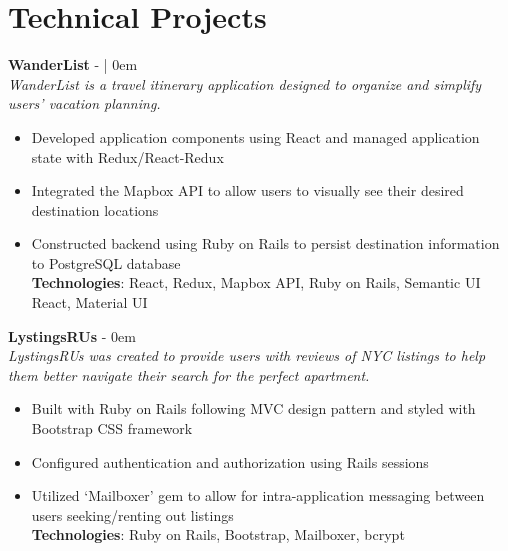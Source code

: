 \documentclass[letterpaper]{twentysecondcv} %
\begin{document}
 \makeprofile %
 

\section{Technical Projects}
\begin{flushleft}
\textbf{WanderList} - |{}
\openup 0em
\\
\textit {WanderList is a travel itinerary application designed to organize and simplify users’ vacation planning.}
\vspace{-2mm}
\begin{itemize}
    \setlength\itemsep{-0.5em}
    \item Developed application components using React and managed application state with Redux/React-Redux
    \item Integrated the Mapbox API to allow users to visually see their desired destination locations
    \item Constructed backend using Ruby on Rails to persist destination information to PostgreSQL database
    \\
    \textbf{Technologies}: React, Redux, Mapbox API, Ruby on Rails, Semantic UI React, Material UI
\end{itemize}

\textbf{LystingsRUs } - {}
\openup 0em
\\
\textit {LystingsRUs was created to provide users with reviews of NYC listings to help them better navigate their search for the perfect apartment.}
\vspace{-2mm}
\begin{itemize}
    \setlength\itemsep{-0.5em}
    \item Built with Ruby on Rails following MVC design pattern and styled with Bootstrap CSS framework
    \item Configured authentication and authorization using Rails sessions
    \item Utilized ‘Mailboxer’ gem to allow for intra-application messaging between users seeking/renting out listings
    \\
    \textbf{Technologies}: Ruby on Rails, Bootstrap, Mailboxer, bcrypt
\end{itemize}
    

\end{flushleft}
\end{document}
